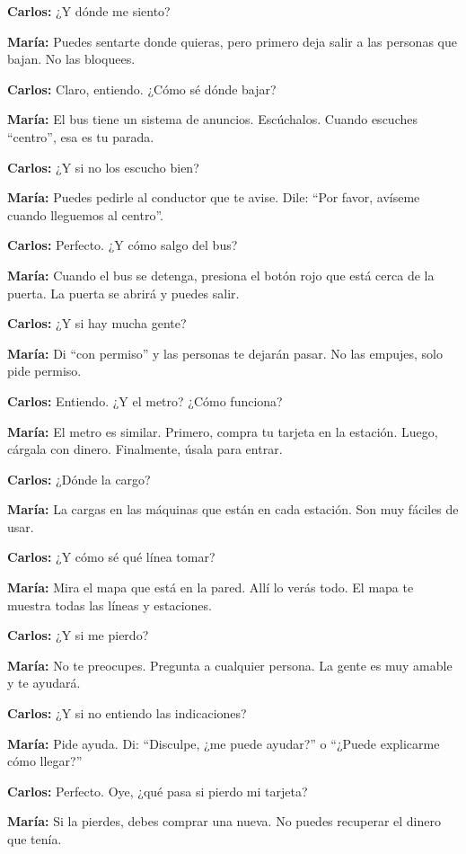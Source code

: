 \documentclass[12pt,a4paper]{article}
\begin{document}
\textbf{Carlos:} ¿Y dónde me siento?

\textbf{María:} Puedes sentarte donde quieras, pero primero deja salir a las personas que bajan. No las bloquees.

\textbf{Carlos:} Claro, entiendo. ¿Cómo sé dónde bajar?

\textbf{María:} El bus tiene un sistema de anuncios. Escúchalos. Cuando escuches \enquote{centro}, esa es tu parada.

\textbf{Carlos:} ¿Y si no los escucho bien?

\textbf{María:} Puedes pedirle al conductor que te avise. Dile: \enquote{Por favor, avíseme cuando lleguemos al centro}.

\textbf{Carlos:} Perfecto. ¿Y cómo salgo del bus?

\textbf{María:} Cuando el bus se detenga, presiona el botón rojo que está cerca de la puerta. La puerta se abrirá y puedes salir.

\textbf{Carlos:} ¿Y si hay mucha gente?

\textbf{María:} Di \enquote{con permiso} y las personas te dejarán pasar. No las empujes, solo pide permiso.

\textbf{Carlos:} Entiendo. ¿Y el metro? ¿Cómo funciona?

\textbf{María:} El metro es similar. Primero, compra tu tarjeta en la estación. Luego, cárgala con dinero. Finalmente, úsala para entrar.

\textbf{Carlos:} ¿Dónde la cargo?

\textbf{María:} La cargas en las máquinas que están en cada estación. Son muy fáciles de usar.

\textbf{Carlos:} ¿Y cómo sé qué línea tomar?

\textbf{María:} Mira el mapa que está en la pared. Allí lo verás todo. El mapa te muestra todas las líneas y estaciones.

\textbf{Carlos:} ¿Y si me pierdo?

\textbf{María:} No te preocupes. Pregunta a cualquier persona. La gente es muy amable y te ayudará.

\textbf{Carlos:} ¿Y si no entiendo las indicaciones?

\textbf{María:} Pide ayuda. Di: \enquote{Disculpe, ¿me puede ayudar?} o \enquote{¿Puede explicarme cómo llegar?}

\textbf{Carlos:} Perfecto. Oye, ¿qué pasa si pierdo mi tarjeta?

\textbf{María:} Si la pierdes, debes comprar una nueva. No puedes recuperar el dinero que tenía.
\end{document}
